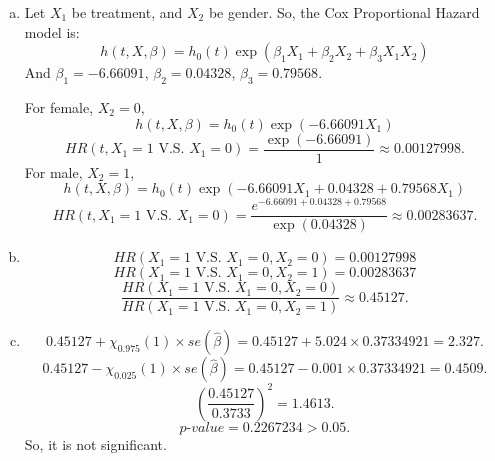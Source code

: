 \documentclass[12pt]{elegantbook}
\begin{document}
    \begin{solution}
        \begin{enumerate}[(a)]
            \item Let $X_1$ be treatment, and $X_2$ be gender. So, the Cox Proportional Hazard model is: 
            \[h(t, X, \beta)=h_0(t)\exp(\beta_1X_1+\beta_2X_2+\beta_3X_1X_2)\]
            And $\beta_1=-6.66091$, $\beta_2=0.04328$, $\beta_3=0.79568$. 

            For female, $X_2=0$, 
            \[h(t, X, \beta)=h_0(t)\exp(-6.66091X_1)\]
            \[HR(t, X_1=1\text{ V.S. }X_1=0)=\frac{\exp(-6.66091)}{1}\approx 0.00127998. \]
            For male, $X_2=1$, 
            \[h(t, X, \beta)=h_0(t)\exp(-6.66091X_1+0.04328+0.79568X_1)\]
            \[HR(t, X_1=1\text{ V.S. }X_1=0)=\frac{e^{-6.66091+0.04328+0.79568}}{\exp(0.04328)}\approx 0.00283637. \]
            \item \[HR(X_1=1\text{ V.S. }X_1=0, X_2=0)=0.00127998 \]
            \[HR(X_1=1\text{ V.S. }X_1=0, X_2=1)=0.00283637 \]
            \[\frac{HR(X_1=1\text{ V.S. }X_1=0, X_2=0)}{HR(X_1=1\text{ V.S. }X_1=0, X_2=1)}\approx 0.45127. \]
            \item \[0.45127+ \chi_{0.975}(1)\times se(\hat{\beta})=0.45127+5.024\times0.37334921=2.327.\]
            \[0.45127- \chi_{0.025}(1)\times se(\hat{\beta})=0.45127-0.001\times0.37334921=0.4509. \]
            \[\left(\frac{0.45127}{0.3733}\right)^2=1.4613. \]
            \[p\text{-}value=0.2267234>0.05. \]
            So, it is not significant. 
        \end{enumerate}
    \end{solution}
\end{document}
